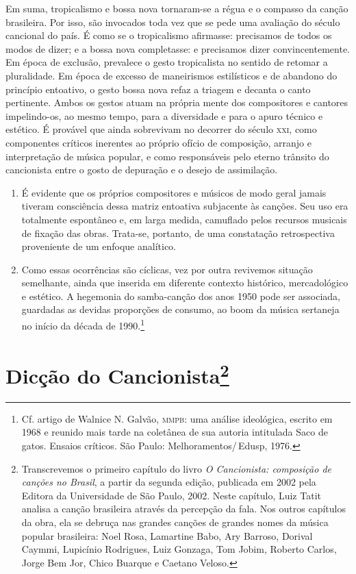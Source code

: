 Em suma, tropicalismo e bossa nova tornaram-se a régua e o compasso da
canção brasileira. Por isso, são invocados toda vez que se pede uma
avaliação do século cancional do país. É como se o tropicalismo
afirmasse: precisamos de todos os modos de dizer; e a bossa nova
completasse: e precisamos dizer convincentemente. Em época de exclusão,
prevalece o gesto tropicalista no sentido de retomar a pluralidade. Em
época de excesso de maneirismos estilísticos e de abandono do princípio
entoativo, o gesto bossa nova refaz a triagem e decanta o canto
pertinente. Ambos os gestos atuam na própria mente dos compositores e
cantores impelindo-os, ao mesmo tempo, para a diversidade e para o apuro
técnico e estético. É provável que ainda sobrevivam no decorrer do
século \textsc{xxi}, como componentes críticos inerentes ao próprio ofício de
composição, arranjo e interpretação de música popular, e como
responsáveis pelo eterno trânsito do cancionista entre o gosto de
depuração e o desejo de assimilação.

\begin{enumerate}
\item É evidente que os próprios compositores e músicos de modo geral
jamais tiveram consciência dessa matriz entoativa subjacente às canções.
Seu uso era totalmente espontâneo e, em larga medida, camuflado pelos
recursos musicais de fixação das obras. Trata-se, portanto, de uma
constatação retrospectiva proveniente de um enfoque analítico.

\item Como essas ocorrências são cíclicas, vez por outra revivemos
situação semelhante, ainda que inserida em diferente contexto histórico,
mercadológico e estético. A hegemonia do samba-canção dos anos 1950 pode
ser associada, guardadas as devidas proporções de consumo, ao boom da
música sertaneja no início da década de 1990.\footnote{Cf. artigo de Walnice N. Galvão, \textsc{mmpb}: uma análise ideológica, escrito em 1968 e reunido mais tarde na coletânea de sua autoria intitulada Saco de gatos. Ensaios críticos. São Paulo: Melhoramentos/\,Edusp, 1976.} 
\end{enumerate}

\chapter{Dicção do Cancionista\footnote{Transcrevemos o primeiro capítulo do livro \textit{O Cancionista: composição de canções no Brasil}, a partir da segunda edição, publicada em 2002 pela Editora da Universidade de São Paulo,
2002. Neste capítulo, Luiz Tatit analisa a canção brasileira através da percepção da fala. Nos outros capítulos da obra, ela se debruça nas grandes canções de grandes nomes da música popular brasileira: Noel Rosa, Lamartine Babo, Ary Barroso, Dorival Caymmi, Lupicínio Rodrigues, Luiz Gonzaga, Tom Jobim, Roberto Carlos, Jorge Bem Jor, Chico Buarque e Caetano Veloso.}}

